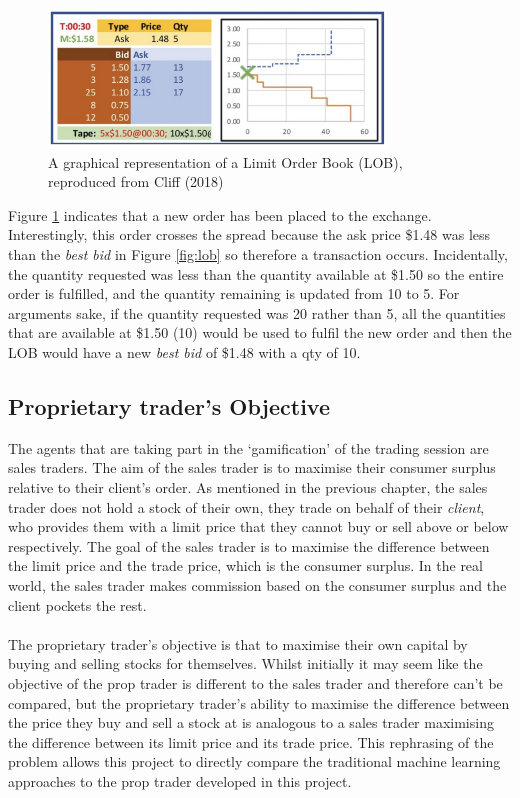 \documentclass[ %
                    author={Ashwinder Khurana},
                supervisor={Prof Dave Cliff},
                    degree={MEng},
                     title={The Deeply Reinforced Trader},
                  subtitle={},
                      type={enterprise},
                      year={2020} ]{dissertation}
\begin{document}
\begin{figure}[H]
	\centering
	\includegraphics[width=0.8\textwidth]{LOB-Postcross.png}
	\caption{A graphical representation of a Limit Order Book (LOB), reproduced from Cliff (2018)}
	\label{fig:LobPost}  
\end{figure}
\noindent
Figure \ref{fig:LobPost} indicates that a new order has been placed to the exchange. Interestingly, this order crosses the spread because the ask price \$1.48 was less than the \textit{best bid} in Figure \ref{fig:lob} so therefore a transaction occurs. Incidentally, the quantity requested was less than the quantity available at \$1.50 so the entire order is fulfilled, and the quantity remaining is updated from 10 to 5. For arguments sake, if the quantity requested was 20 rather than 5, all the quantities that are available at \$1.50 (10) would be used to fulfil the new order and then the LOB would have a new \textit{best bid} of \$1.48 with a qty of 10. 
\vspace{1cm}
\subsection{Proprietary trader's Objective}
\vspace{0.5cm}
The agents that are taking part in the \enquote*{gamification} of the trading session are sales traders. The aim of the sales trader is to maximise their consumer surplus relative to their client's order. As mentioned in the previous chapter, the sales trader does not hold a stock of their own, they trade on behalf of their \textit{client}, who provides them with a limit price that they cannot buy or sell above or below respectively. The goal of the sales trader is to maximise the difference between the limit price and the trade price, which is the consumer surplus. In the real world, the sales trader makes commission based on the consumer surplus and the client pockets the rest. 
\\
\\
The proprietary trader's objective is that to maximise their own capital by buying and selling stocks for themselves. Whilst initially it may seem like the objective of the prop trader is different to the sales trader and therefore can't be compared, but the proprietary trader's ability to maximise the difference between the price they buy and sell a stock at is analogous to a sales trader maximising the difference between its limit price and its trade price. This rephrasing of the problem allows this project to directly compare the traditional machine learning approaches to the prop trader developed in this project.
\end{document}
